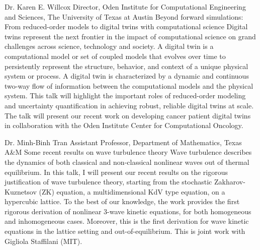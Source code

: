\label{plenary3}
\plenabs
{Dr. Karen E. Willcox}
{Director, Oden Institute for Computational Engineering and Sciences, The University of Texas at Austin}
{Beyond forward simulations: From reduced-order models to digital twins with computational science}
{Digital twins represent the next frontier in the impact of computational science on grand challenges across science, technology and society. A digital twin is a computational model or set of coupled models that evolves over time to persistently represent the structure, behavior, and context of a unique physical system or process. A digital twin is characterized by a dynamic and continuous two-way flow of information between the computational models and the physical system. This talk will highlight the important roles of reduced-order modeling and uncertainty quantification in achieving robust, reliable digital twins at scale. The talk will present our recent work on developing cancer patient digital twins in collaboration with the Oden Institute Center for Computational Oncology.}
\bigskip


\label{plenary4}
\plenabs
{Dr. Minh-Binh Tran}
{Assistant Professor, Department of Mathematics, Texas A\&M}
{Some recent results on wave turbulence theory}
{Wave turbulence describes the dynamics of both classical and non-classical nonlinear waves out of thermal equilibrium. In this talk, I will present our recent results on the rigorous justification of wave turbulence theory, starting from the stochastic Zakharov-Kuznetsov (ZK) equation, a multidimensional KdV type equation, on a hypercubic lattice. To the best of our knowledge, the work provides the first rigorous derivation of nonlinear 3-wave kinetic equations, for both homogeneous and inhomogeneous cases. Moreover, this is the first derivation for wave kinetic equations in the lattice setting and out-of-equilibrium. This is joint work with Gigliola Staffilani (MIT).}
